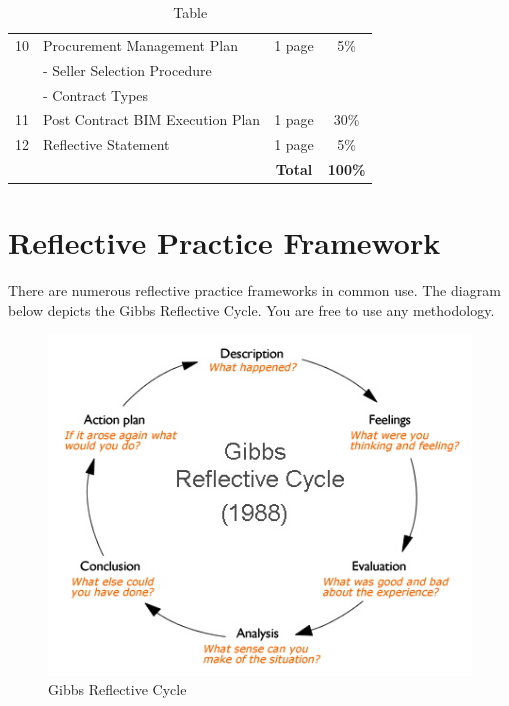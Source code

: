 \begin{table}[ht]
\begin{tabular}{|c|l|c|c|}
		10  & Procurement Management Plan &  1 page  & 5\% \\
   			&	- Seller Selection Procedure  & & \\
   			&	- Contract Types  & & \\
		\hline

		11  & Post Contract BIM Execution Plan &  1 page  & 30\% \\
		\hline
		12  & Reflective Statement &  1 page  & 5\% \\
		
		
		\hline
		\hline
        & & \textbf{Total} & \textbf{100\%} \\
		\hline
	
	\end{tabular}
	\caption{Table }
	\label{tab:AM}
\end{table}


\newpage

\section*{Reflective Practice Framework}

There are numerous reflective practice frameworks in common use.  The diagram below depicts the Gibbs Reflective Cycle.  You are free to use any methodology.


\begin{figure}[h!]
	\centering
	\includegraphics[width=1.0\linewidth]{Images/gibbs-diagram}
	\caption{Gibbs Reflective Cycle}
	\label{fig:gibbs-diagram}
\end{figure}




